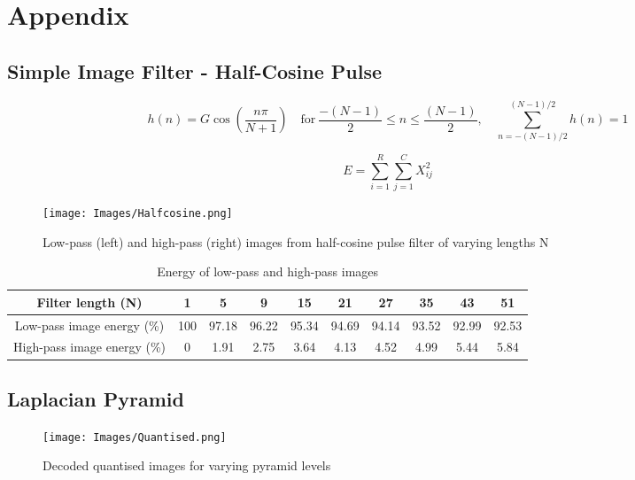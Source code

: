 \newpage
\appendix
\section{Appendix}
\subsection{Simple Image Filter - Half-Cosine Pulse}

\begin{equation}
    h(n) = G \cos \left( \frac{n\pi}{N+1} \right) \quad \text{for} {\ } \frac{-\left(N-1\right)}{2} \leq n \leq \frac{\left(N-1\right)}{2}, \quad \sum_{n = -(N-1)/2}^{(N-1)/2} h(n) = 1
    \label{eqn:halfcos}
\end{equation}

\begin{equation}
    E = \sum_{i=1}^{R}\sum_{j=1}^{C} X_{ij}^{2}
\label{eqn:energy}
\end{equation}

\begin{figure}[!htbp]
    \centering
    \texttt{[image: Images/Halfcosine.png]}
    \caption{Low-pass (left) and high-pass (right) images from half-cosine pulse filter of varying lengths N }
    \label{fig:halfcosine}
\end{figure}

\begin{table}[h]
\centering
\begin{tabular}{|c|c|c|c|c|c|c|c|c|c|}
\hline
Filter length (N) & 1 & 5 & 9 & 15 & 21 & 27 & 35 & 43 & 51\\
\hline
Low-pass image energy (\%) & 100 & 97.18 & 96.22 & 95.34 & 94.69 & 94.14 & 93.52 & 92.99 & 92.53\\
\hline
High-pass image energy (\%) & 0 & 1.91 & 2.75 & 3.64 & 4.13 & 4.52 & 4.99 & 5.44 & 5.84\\
\hline
\end{tabular}
\caption{Energy of low-pass and high-pass images}
\label{table:energy}
\vspace{-0.7cm}
\end{table}

\subsection{Laplacian Pyramid}
\begin{figure}[!htbp]
    \centering
    \texttt{[image: Images/Quantised.png]}
    \caption{Decoded quantised images for varying pyramid levels}
    \label{fig:quantised}
\end{figure}

